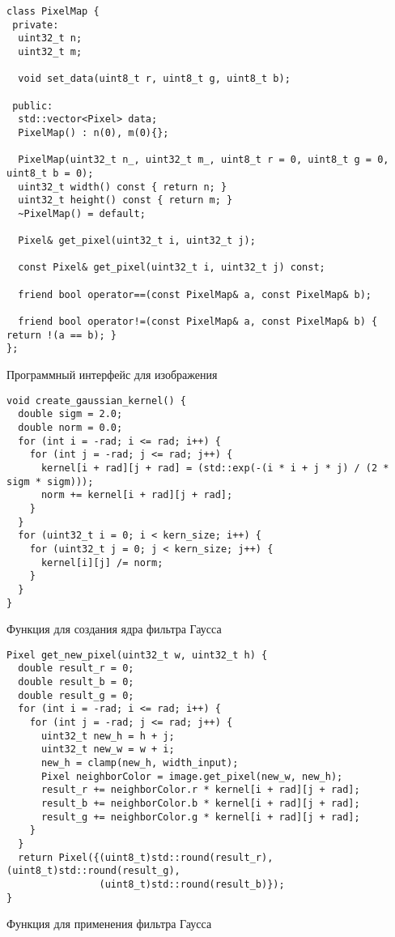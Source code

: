 \documentclass[12pt]{article}
\newenvironment{longlisting}{\captionsetup{type=listing, name=Приложение}}{}
\begin{document}
\begin{longlisting}
\begin{verbatim}
class PixelMap {
 private:
  uint32_t n;
  uint32_t m;

  void set_data(uint8_t r, uint8_t g, uint8_t b);

 public:
  std::vector<Pixel> data;
  PixelMap() : n(0), m(0){};

  PixelMap(uint32_t n_, uint32_t m_, uint8_t r = 0, uint8_t g = 0, uint8_t b = 0);
  uint32_t width() const { return n; }
  uint32_t height() const { return m; }
  ~PixelMap() = default;

  Pixel& get_pixel(uint32_t i, uint32_t j);

  const Pixel& get_pixel(uint32_t i, uint32_t j) const;

  friend bool operator==(const PixelMap& a, const PixelMap& b);

  friend bool operator!=(const PixelMap& a, const PixelMap& b) { return !(a == b); }
};
\end{verbatim}
\caption{Программный интерфейс для изображения}
\label{lst:pixel_map}
\end{longlisting}

\begin{longlisting}
\begin{verbatim}
void create_gaussian_kernel() {
  double sigm = 2.0;
  double norm = 0.0;
  for (int i = -rad; i <= rad; i++) {
    for (int j = -rad; j <= rad; j++) {
      kernel[i + rad][j + rad] = (std::exp(-(i * i + j * j) / (2 * sigm * sigm)));
      norm += kernel[i + rad][j + rad];
    }
  }
  for (uint32_t i = 0; i < kern_size; i++) {
    for (uint32_t j = 0; j < kern_size; j++) {
      kernel[i][j] /= norm;
    }
  }
}
\end{verbatim}
\caption{Функция для создания ядра фильтра Гаусса}
\label{lst:kernel}
\end{longlisting}


\begin{longlisting}
\begin{verbatim}
Pixel get_new_pixel(uint32_t w, uint32_t h) {
  double result_r = 0;
  double result_b = 0;
  double result_g = 0;
  for (int i = -rad; i <= rad; i++) {
    for (int j = -rad; j <= rad; j++) {
      uint32_t new_h = h + j;
      uint32_t new_w = w + i;
      new_h = clamp(new_h, width_input);
      Pixel neighborColor = image.get_pixel(new_w, new_h);
      result_r += neighborColor.r * kernel[i + rad][j + rad];
      result_b += neighborColor.b * kernel[i + rad][j + rad];
      result_g += neighborColor.g * kernel[i + rad][j + rad];
    }
  }
  return Pixel({(uint8_t)std::round(result_r),(uint8_t)std::round(result_g),
                (uint8_t)std::round(result_b)});
}
\end{verbatim}
\caption{Функция для применения фильтра Гаусса}
\label{lst:apply}
\end{longlisting}
\end{document}
